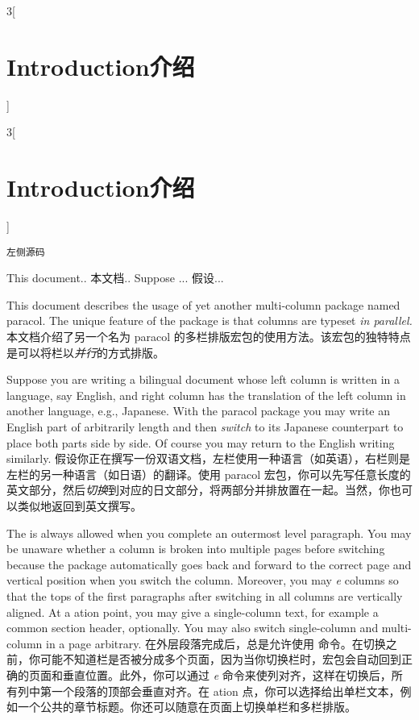 \begin{paracol}{3}[\section{Introduction\hfill 介绍}]
\begin{VerbatimII}
\begin{paracol}{3}[\section{Introduction\hfill 介绍}]
\begin{Verbatim}
左侧源码
\end{Verbatim}
\switchcolumn
This document..
\switchcolumn
本文档..
\switchcolumn[1]
Suppose ...
\switchcolumn
假设...
\end{paracol}    
\end{VerbatimII}
\switchcolumn
This document describes the usage of yet another multi-column package named
\textsf{paracol}.  The unique feature of the package is that columns are
typeset {\em in parallel.}
\switchcolumn
本文档介绍了另一个名为 \textsf{paracol} 的多栏排版宏包的使用方法。该宏包的独特特点是可以将栏以{\em 并行}的方式排版。 

\switchcolumn[1]
Suppose you are writing a bilingual document whose left column is written in
a language, say English, and right column has the translation of the left
column in another language, e.g., Japanese.  With the \textsf{paracol}
package you may write an English part of arbitrarily length and then {\em
switch} to its Japanese counterpart to place both parts side by side.  Of
course you may return to the English writing similarly.
\switchcolumn
假设你正在撰写一份双语文档，左栏使用一种语言（如英语），右栏则是左栏的另一种语言（如日语）的翻译。使用 \textsf{paracol} 宏包，你可以先写任意长度的英文部分，然后{\em 切换}到对应的日文部分，将两部分并排放置在一起。当然，你也可以类似地返回到英文撰写。

\switchcolumn[1]
The {\em\Uidx\cswitch} is always allowed when you complete an outermost
level paragraph.  You may be unaware whether a column is broken into
multiple pages before switching because the package automatically goes
back and forward to the correct page and vertical position when you switch
the column.  Moreover, you may {\em\Uidx\sync{}e} columns so that the tops
of the first paragraphs after switching in all columns are vertically
aligned.  At a \sync{}ation point, you may give a single-column text,
for example a common section header, optionally.  You may also switch
single-column and multi-column in a page arbitrary.
\switchcolumn
在外层段落完成后，总是允许使用 {\em\Uidx\cswitch} 命令。在切换之前，你可能不知道栏是否被分成多个页面，因为当你切换栏时，宏包会自动回到正确的页面和垂直位置。此外，你可以通过 {\em\Uidx\sync{}e} 命令来使列对齐，这样在切换后，所有列中第一个段落的顶部会垂直对齐。在 \sync{}ation 点，你可以选择给出单栏文本，例如一个公共的章节标题。你还可以随意在页面上切换单栏和多栏排版。


\end{paracol}
